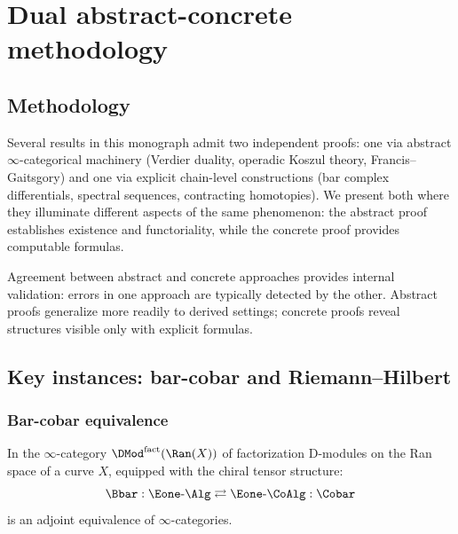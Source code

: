 \chapter{Dual abstract-concrete methodology}
\label{app:dual-methodology}


\section{Methodology}
\label{sec:philosophy}

\begin{convention}
\label{conv:dual-proof}
Several results in this monograph admit two independent proofs: one via abstract $\infty$-categorical machinery (Verdier duality, operadic Koszul theory, Francis--Gaitsgory) and one via explicit chain-level constructions (bar complex differentials, spectral sequences, contracting homotopies). We present both where they illuminate different aspects of the same phenomenon: the abstract proof establishes existence and functoriality, while the concrete proof provides computable formulas.
\end{convention}

\begin{remark}
\label{rem:dual-proofs}
Agreement between abstract and concrete approaches provides internal validation: errors in one approach are typically detected by the other. Abstract proofs generalize more readily to derived settings; concrete proofs reveal structures visible only with explicit formulas.
\end{remark}


\section{Key instances: bar-cobar and Riemann--Hilbert}
\label{sec:key-instances}

\subsection{Bar-cobar equivalence}

\begin{theorem}
\label{thm:abstract-bar-cobar}
In the $\infty$-category $\DMod^{\mathrm{fact}}(\Ran(X))$ of factorization
D-modules on the Ran space of a curve $X$, equipped with the chiral tensor
structure:
\[
\Bbar: \Eone\text{-}\Alg \rightleftarrows \Eone\text{-}\CoAlg : \Cobar
\]
is an adjoint equivalence of $\infty$-categories.
\end{theorem}

